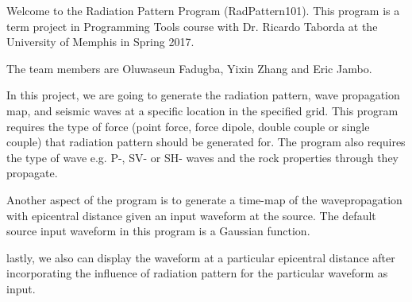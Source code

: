 \-Welcome to the \-Radiation \-Pattern \-Program (\-Rad\-Pattern101). \-This program is a term project in \-Programming \-Tools course with \-Dr. \-Ricardo \-Taborda at the \-University of \-Memphis in \-Spring 2017.

\-The team members are \-Oluwaseun \-Fadugba, \-Yixin \-Zhang and \-Eric \-Jambo.

\-In this project, we are going to generate the radiation pattern, wave propagation map, and seismic waves at a specific location in the specified grid. \-This program requires the type of force (point force, force dipole, double couple or single couple) that radiation pattern should be generated for. \-The program also requires the type of wave e.\-g. \-P-\/, \-S\-V-\/ or \-S\-H-\/ waves and the rock properties through they propagate.

\-Another aspect of the program is to generate a time-\/map of the wavepropagation with epicentral distance given an input waveform at the source. \-The default source input waveform in this program is a \-Gaussian function.

lastly, we also can display the waveform at a particular epicentral distance after incorporating the influence of radiation pattern for the particular waveform as input. 